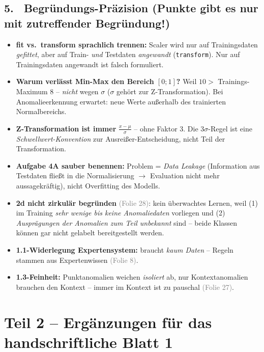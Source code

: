 \documentclass[10pt,a4paper]{article}
\newcommand{\folie}[1]{\textcolor{gray}{\footnotesize(#1)}}
\newcommand{\checkbox}{\raisebox{-1pt}{\fbox{\rule{0pt}{7pt}\rule{7pt}{0pt}}}\hspace{6pt}}
\begin{document}
\subsection*{5. \ Begründungs-Präzision (Punkte gibt es nur mit zutreffender Begründung!)}
\begin{itemize}
  \item[\checkbox] \textbf{fit vs.\ transform sprachlich trennen:} Scaler wird nur auf Trainingsdaten \emph{gefittet}, aber auf Train- \emph{und} Testdaten \emph{angewandt} (\texttt{transform}). \glqq Nur auf Trainingsdaten angewandt\grqq{} ist falsch formuliert.
  \item[\checkbox] \textbf{Warum verlässt Min-Max den Bereich $[0;1]$?} Weil $10 >$ Trainings-Maximum $8$ -- \emph{nicht} wegen $\sigma$ ($\sigma$ gehört zur Z-Transformation). Bei Anomalieerkennung erwartet: neue Werte außerhalb des trainierten Normalbereichs.
  \item[\checkbox] \textbf{Z-Transformation ist immer} $\frac{x-\mu}{\sigma}$ -- ohne Faktor 3. Die $3\sigma$-Regel ist eine \emph{Schwellwert-Konvention} zur Ausreißer-Entscheidung, nicht Teil der Transformation.
  \item[\checkbox] \textbf{Aufgabe 4A sauber benennen:} Problem = \emph{Data Leakage} (Information aus Testdaten fließt in die Normalisierung $\to$ Evaluation nicht mehr aussagekräftig), nicht Overfitting des Modells.
  \item[\checkbox] \textbf{2d nicht zirkulär begründen} \folie{Folie 28}: kein überwachtes Lernen, weil (1) im Training \emph{sehr wenige bis keine Anomaliedaten} vorliegen und (2) \emph{Ausprägungen der Anomalien zum Teil unbekannt} sind -- beide Klassen können gar nicht gelabelt bereitgestellt werden.
  \item[\checkbox] \textbf{1.1-Widerlegung Expertensystem:} braucht \emph{kaum Daten} -- Regeln stammen aus Expertenwissen \folie{Folie 8}.
  \item[\checkbox] \textbf{1.3-Feinheit:} Punktanomalien weichen \emph{isoliert} ab, nur Kontextanomalien brauchen den Kontext -- \glqq immer im Kontext\grqq{} ist zu pauschal \folie{Folie 27}.
\end{itemize}

\newpage

\section*{Teil 2 -- Ergänzungen für das handschriftliche Blatt \textcircled{\small 1}}
\end{document}
